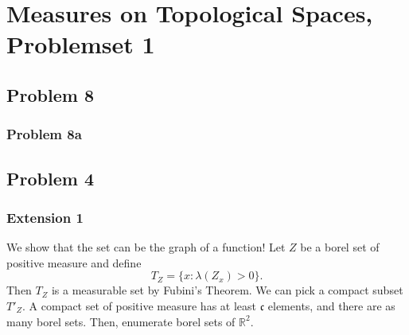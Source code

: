 \chapter{Measures on Topological Spaces, Problemset 1}

\section*{Problem 8}
\subsection*{Problem 8a}

\section*{Problem 4}


\subsection*{Extension 1}
We show that the set can be the graph of a function! Let \(Z\) be a borel set of positive measure and define
\[
    T_Z = \{ x : \lambda(Z_x) > 0 \}.
\]
Then \(T_Z\) is a measurable set by Fubini's Theorem. We can pick a compact subset \( T'_Z \). A compact set of positive measure has at least \(\mathfrak{c}\) elements, and there are as many borel sets. Then, enumerate borel sets of \( \mathbb{R}^2 \).
